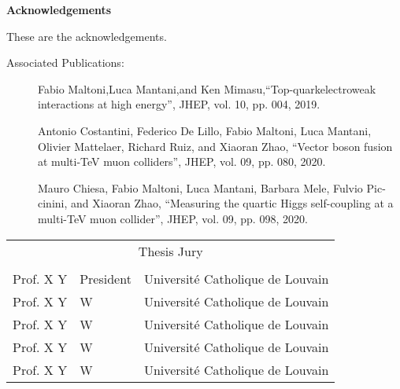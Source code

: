 
\hfill
\newenvironment{acknowledgements}%
    {\cleardoublepage\thispagestyle{empty}\null\vfill\begin{center}%
    \bfseries Acknowledgements\end{center}}%
    {\vfill\null}
        \begin{acknowledgements}
        These are the acknowledgements.
        \end{acknowledgements}

\clearpage

\begin{center}

\vspace{121pt}

{\LARGE Associated Publications:}
\vspace{22pt}
\begin{description}
\item[\cite{Maltoni:2019aot}] 
Fabio Maltoni,Luca Mantani,and Ken Mimasu,“Top-quarkelectroweak interactions at high energy”, JHEP, vol. 10, pp. 004, 2019.
\item[\cite{Costantini:2020stv}]
Antonio Costantini, Federico De Lillo, Fabio Maltoni, Luca Mantani, Olivier Mattelaer, Richard Ruiz, and Xiaoran Zhao, “Vector boson fusion at multi-TeV muon colliders”, JHEP, vol. 09, pp. 080, 2020.
\item[\cite{Chiesa:2020awd}]
Mauro Chiesa, Fabio Maltoni, Luca Mantani, Barbara Mele, Fulvio Pic- cinini, and Xiaoran Zhao, “Measuring the quartic Higgs self-coupling at a multi-TeV muon collider”, JHEP, vol. 09, pp. 098, 2020.
\end{description}

\vfill
\begin{tabular}{llc} 
\multicolumn{3}{c}{\large Thesis Jury}                                  \\
                    &               &                           \\
\toprule 
Prof. X Y       & President     & Université Catholique de Louvain  \\
Prof. X Y       & W    & Université Catholique de Louvain  \\
Prof. X Y       & W    & Université Catholique de Louvain  \\
Prof. X Y       & W    & Université Catholique de Louvain  \\
Prof. X Y       & W    & Université Catholique de Louvain  \\
\bottomrule
\end{tabular}

\vspace{44pt}

\end{center}

\pagestyle{empty}
\tableofcontents
